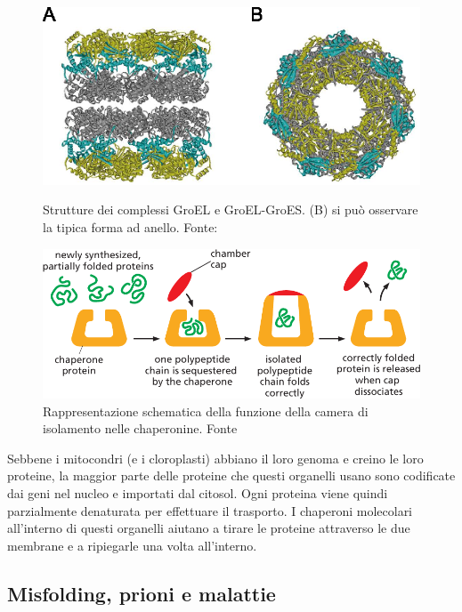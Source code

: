 {\begin{figure}[!htb]
	\includegraphics[scale=0.25]{images/groel.png}
	\caption{Strutture dei complessi GroEL e GroEL-GroES. (B) si può osservare la tipica forma ad anello. Fonte: \cite{Iizuka2016ChaperoninGU}}
	\label{fig:groel}
	\endminipage\hfill
	\centering
	\includegraphics[scale=0.4]{images/chaperone-alberts-isolation.png}
	\caption{Rappresentazione schematica della funzione della camera di isolamento nelle chaperonine. Fonte \cite{alberts2018essential}}
	\label{fig:chaperone-camera}
	\endminipage\hfill
\end{figure}

Sebbene i mitocondri (e i cloroplasti) abbiano il loro genoma e creino le loro proteine, la maggior parte delle proteine che questi organelli usano sono codificate dai geni nel nucleo e importati dal citosol. Ogni proteina viene quindi parzialmente denaturata per effettuare il trasporto. I chaperoni molecolari all'interno di questi organelli aiutano a tirare le proteine attraverso le due membrane e a ripiegarle una volta all'interno\supercite{alberts2018essential}.


\subsection{Misfolding, prioni e malattie}
{
	
}}
